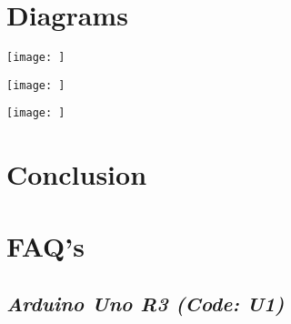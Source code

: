 \documentclass{article}
\begin{document}
\section{\textbf{Diagrams}}
\begin{center}
	\texttt{[image: ]}
\end{center}
\begin{center}
	\textbf{}
\end{center}
\vspace{10pt}
\begin{center}
	\texttt{[image: ]}
\end{center}
\begin{center}
	\textbf{}
\end{center}
\vspace{10pt}
\begin{center}
	\texttt{[image: ]}
\end{center}
\begin{center}
	\textbf{}
\end{center}

\section{\textbf{Conclusion}}

\section{\textbf{FAQ's}}
\subsection{\textit{Arduino Uno R3 (Code: U1)}}
\end{document}
